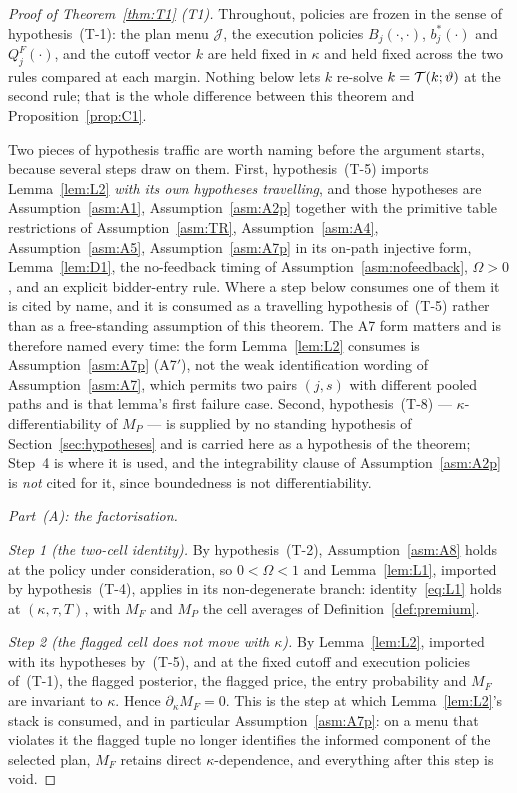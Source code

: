 \begin{proof}[Proof of Theorem~\ref{thm:T1} (T1)]
Throughout, policies are frozen in the sense of hypothesis~(T-1): the plan menu $\mathcal J$, the
execution policies $B_j(\cdot,\cdot)$, $b_j^*(\cdot)$ and $Q_j^F(\cdot)$, and the cutoff vector $k$
are held fixed in $\kappa$ and held fixed across the two rules compared at each margin. Nothing
below lets $k$ re-solve $k = \mathcal{T}(k;\vartheta)$ at the second rule; that is the whole difference
between this theorem and Proposition~\ref{prop:C1}.

Two pieces of hypothesis traffic are worth naming before the argument starts, because several steps
draw on them. First, hypothesis~(T-5) imports Lemma~\ref{lem:L2} \emph{with its own hypotheses
travelling}, and those hypotheses are Assumption~\ref{asm:A1}, Assumption~\ref{asm:A2p} together
with the primitive table restrictions of Assumption~\ref{asm:TR}, Assumption~\ref{asm:A4},
Assumption~\ref{asm:A5}, Assumption~\ref{asm:A7p} in its on-path injective form,
Lemma~\ref{lem:D1}, the no-feedback timing of Assumption~\ref{asm:nofeedback}, $\Omega > 0$, and an
explicit bidder-entry rule. Where a step below consumes one of them it is cited by name, and it is
consumed as a travelling hypothesis of~(T-5) rather than as a free-standing assumption of this
theorem. The A7 form matters and is therefore named every time: the form
Lemma~\ref{lem:L2} consumes is Assumption~\ref{asm:A7p} (A7$'$), not the weak identification
wording of Assumption~\ref{asm:A7}, which permits two pairs $(j,s)$ with different pooled paths and
is that lemma's first failure case. Second, hypothesis~(T-8) --- $\kappa$-differentiability of
$M_P$ --- is supplied by no standing hypothesis of Section~\ref{sec:hypotheses} and is carried here
as a hypothesis of the theorem; Step~4 is where it is used, and the integrability clause of
Assumption~\ref{asm:A2p} is \emph{not} cited for it, since boundedness is not differentiability.

\medskip
\noindent\emph{Part~(A): the factorisation.}

\emph{Step 1 (the two-cell identity).} By hypothesis~(T-2), Assumption~\ref{asm:A8} holds at the
policy under consideration, so $0 < \Omega < 1$ and Lemma~\ref{lem:L1}, imported by
hypothesis~(T-4), applies in its non-degenerate branch: identity~\eqref{eq:L1} holds at
$(\kappa,\tau,T)$, with $M_F$ and $M_P$ the cell averages of Definition~\ref{def:premium}.

\emph{Step 2 (the flagged cell does not move with $\kappa$).} By Lemma~\ref{lem:L2}, imported with
its hypotheses by~(T-5), and at the fixed cutoff and execution policies of~(T-1), the flagged
posterior, the flagged price, the entry probability and $M_F$ are invariant to $\kappa$. Hence
$\partial_\kappa M_F = 0$. This is the step at which Lemma~\ref{lem:L2}'s stack is consumed, and in
particular Assumption~\ref{asm:A7p}: on a menu that violates it the flagged tuple no longer
identifies the informed component of the selected plan, $M_F$ retains direct $\kappa$-dependence,
and everything after this step is void.


\end{proof}
